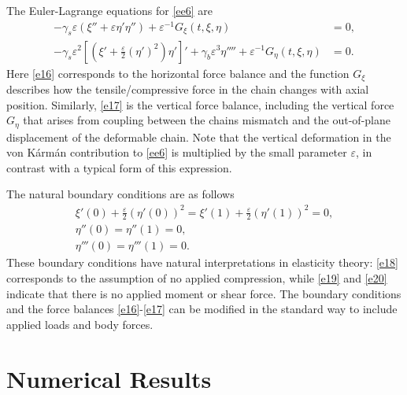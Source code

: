 \documentclass{siamltex}
\newcommand{\eps}{\varepsilon}
\begin{document}


The Euler-Lagrange equations for \eqref{ee6} are
%
\begin{align}
	-\gamma_{s}\varepsilon (\xi'' + \varepsilon \eta'\eta'')
        +
        \varepsilon^{-1}G_{\xi}(t,\xi,\eta)
        &=0, \label{e16}\\
%
	-\gamma_{s}\varepsilon^2\left[\left(\xi' + \frac{\varepsilon}{2}(\eta')^{2}\right)\eta'\right]'
        +
        \gamma_{b}\varepsilon^3\eta''''
        +
        \varepsilon^{-1}G_{\eta}(t,\xi,\eta)
        &=0. \label{e17}        
\end{align}
%
{Here \eqref{e16} corresponds to the horizontal force balance and the function $G_\xi$ describes how the tensile/compressive force in the chain changes with axial position. Similarly, \eqref{e17} is the vertical force balance, including the vertical force $G_\eta$ that arises from coupling between the chains mismatch and the out-of-plane displacement of the deformable chain. Note that the vertical deformation in the von K\'arm\'an contribution to \eqref{ee6} is multiplied by the small parameter $\eps$, in contrast with a typical form of this expression. } 

The natural boundary conditions are as follows
%
\begin{gather}
  \xi'(0)+\frac{\varepsilon}{2}(\eta'(0))^{2}
  =
  \xi'(1)+\frac{\varepsilon}{2}(\eta'(1))^{2}=0,
  \label{e18}\\
  \eta''(0)=\eta''(1)=0,\label{e19}\\
  \eta'''(0)=\eta'''(1)=0.\label{e20}
\end{gather}
%
{These boundary conditions have natural interpretations in elasticity theory: \eqref{e18} corresponds to the assumption of no applied compression, while \eqref{e19} and \eqref{e20} indicate that there is no applied moment or shear force. The boundary conditions and the force balances \eqref{e16}-\eqref{e17} can be modified in the standard way to include applied loads and body forces.}

\section{Numerical Results} \label{s3}

\end{document}
